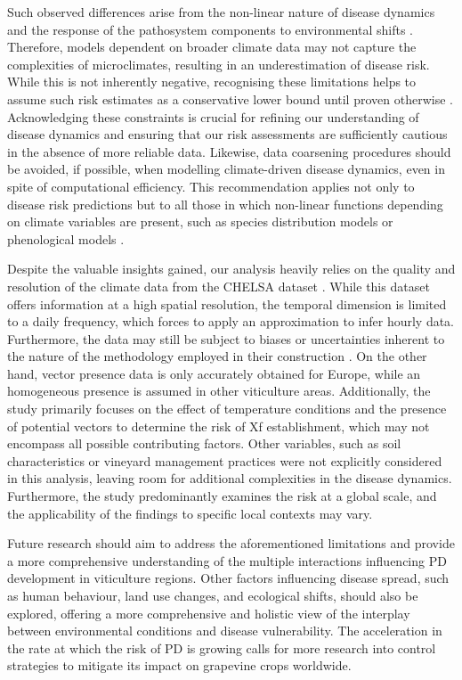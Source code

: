Such observed differences arise from the non-linear nature of disease
dynamics and the response of the pathosystem components to environmental shifts
\cite{scherm1994global,Dudney2021}. Therefore, models dependent on broader
climate data may not capture the complexities of microclimates, resulting in an
underestimation of disease risk.  While this is not inherently negative,
recognising these limitations helps to assume such risk estimates as a
conservative lower bound until proven otherwise . Acknowledging these
constraints is crucial for refining our understanding of disease dynamics and
ensuring that our risk assessments are sufficiently cautious in the absence of
more reliable data. Likewise, data coarsening procedures should be avoided, if
possible, when modelling climate-driven disease dynamics, even in spite of
computational efficiency. This recommendation applies not only to disease risk
predictions but to all those in which non-linear functions depending on climate
variables are present, such as species distribution models or phenological
models \cite{menzel2006european}.

Despite the valuable insights gained,  our analysis heavily relies on the
quality and resolution of the climate data from the CHELSA dataset
\cite{chelsa-climatologies-2021}. While this dataset offers information at a
high spatial resolution, the temporal dimension is limited to a daily
frequency, which forces to apply an approximation to infer hourly data.
Furthermore, the data may still be subject to biases or uncertainties inherent
to the nature of the methodology employed in their construction . On the other
hand, vector presence data is only accurately obtained for Europe, while an
homogeneous presence is assumed in other viticulture areas. Additionally, the
study primarily focuses on the effect of temperature conditions and the
presence of potential vectors to determine the risk of	Xf establishment, which
may not encompass all possible contributing factors. Other variables, such as
soil characteristics or vineyard management practices were not explicitly
considered in this analysis, leaving room for additional complexities in the
disease dynamics. Furthermore, the study predominantly examines the risk at a
global scale, and the applicability of the findings to specific local contexts
may vary.

Future research should aim to address the aforementioned limitations and
provide a more comprehensive understanding of the multiple interactions
influencing PD development  in viticulture regions. Other factors influencing
disease spread, such as human behaviour, land use changes, and ecological
shifts, should also be explored, offering a more comprehensive and holistic
view of the interplay between environmental conditions and disease
vulnerability. The acceleration in the rate at which the risk of PD is growing
calls for more research into control strategies to mitigate its impact on
grapevine crops worldwide.

